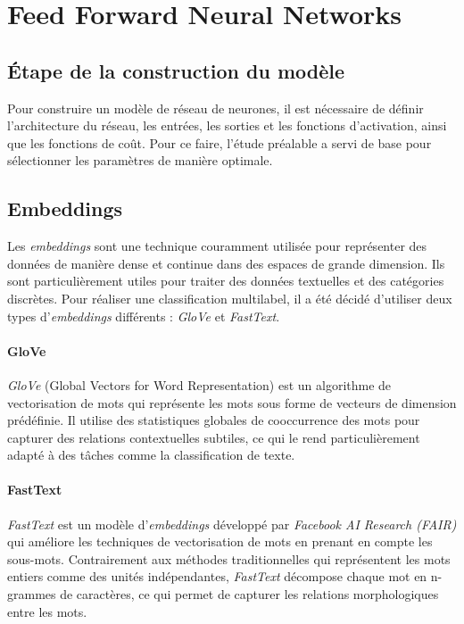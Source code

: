 \chapter{Feed Forward Neural Networks}

\section{Étape de la construction du modèle}

Pour construire un modèle de réseau de neurones, il est nécessaire de définir l'architecture du réseau, les entrées, les sorties et les fonctions d'activation, ainsi que les fonctions de coût. 
Pour ce faire, l'étude préalable a servi de base pour sélectionner les paramètres de manière optimale.

\section{Embeddings}

Les \textit{embeddings} sont une technique couramment utilisée pour représenter des données de manière dense et continue dans des espaces de grande dimension. 
Ils sont particulièrement utiles pour traiter des données textuelles et des catégories discrètes.
Pour réaliser une classification multilabel, il a été décidé d'utiliser deux types d'\textit{embeddings} différents : \textit{GloVe} et \textit{FastText}.

\subsubsection{GloVe}

\textit{GloVe} (Global Vectors for Word Representation) est un algorithme de vectorisation de mots qui représente les mots sous forme de vecteurs de dimension prédéfinie. 
Il utilise des statistiques globales de cooccurrence des mots pour capturer des relations contextuelles subtiles, ce qui le rend particulièrement adapté à des tâches comme la classification de texte.

\subsubsection{FastText}

\textit{FastText} est un modèle d'\textit{embeddings} développé par \textit{Facebook AI Research (FAIR)} qui améliore les techniques de vectorisation de mots en prenant en compte les sous-mots. 
Contrairement aux méthodes traditionnelles qui représentent les mots entiers comme des unités indépendantes, \textit{FastText} décompose chaque mot en n-grammes de caractères, ce qui permet de capturer les relations morphologiques entre les mots.


